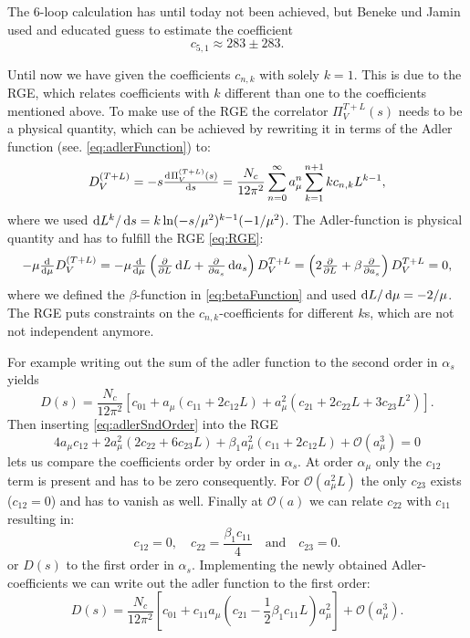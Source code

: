 \documentclass[../../index.tex]{subfiles}
\begin{document}
The 6-loop calculation has until today not been achieved, but Beneke und Jamin
\cite{Beneke2008} used and educated guess to estimate the coefficient
\begin{equation}
  c_{5,1} \approx 283 \pm 283.
\end{equation}

Until now we have given the coefficients $c_{n,k}$ with solely $k=1$. This
is due to the RGE, which relates coefficients with $k$ different than one to the
coefficients mentioned above. To make use of the RGE the correlator $\Pi_V^{T+L}(s)$ needs to
be a physical quantity, which can be achieved by rewriting it in terms of the
Adler function (see. \cref{eq:adlerFunction}) to:
\begin{equation}
  D_V^{(T+L)} = - s \od{\Pi_V^{(T+L)}(s)}{s} = \frac{N_c}{12 \pi^2} \sum_{n=0}^\infty a_\mu^n \sum_{k=1}^{n+1} k c_{n,k} L^{k-1},
\end{equation}
where we used $\dif L^k/ \dif s=k\ln(-s/\mu^2)^{k-1}(-1/\mu^2)$. The
Adler-function is physical quantity and has to fulfill the RGE \cref{eq:RGE}:
\begin{equation}
  -\mu \od{}{\mu} D_V^{(T+L)} = -\mu \od{}{\mu} \left( \pd{}{L} \dif L + \pd{}{a_s} \dif a_s \right) D_V^{T+L}
  = \left( 2\pd{}{L} + \beta \pd{}{a_s} \right) D_V^{T+L} = 0,
\end{equation}
where we defined the $\beta$-function in \cref{eq:betaFunction} and used $\dif L
/ \dif \mu = - 2/ \mu$. The RGE puts constraints on the $c_{n, k}$-coefficients
for different $k$s, which are not not independent anymore.

For example writing out the sum of the adler function to the second order in
$\alpha_s$ yields
\begin{equation}
  \label{eq:adlerSndOrder}
  D(s) = \frac{N_c}{12 \pi^2} \left[ c_{01} + a_\mu(c_{11} + 2 c_{12} L) + a_\mu^2(c_{21} + 2 c_{22} L + 3 c_{23} L^2) \right].
\end{equation}
Then inserting \cref{eq:adlerSndOrder} into the RGE
\begin{equation}
  4 a_\mu c_{12} + 2 a_\mu^2(2 c_{22} + 6 c_{23} L) + \beta_1 a_\mu^2(c_{11} + 2 c_{12}L) + \mathcal{O}(a_\mu^3) = 0
\end{equation}
lets us compare the coefficients order by order in $\alpha_s$. At order
$\alpha_\mu$ only the $c_{12}$ term is present and has to be zero consequently.
For $\mathcal{O}(a_\mu^2 L)$ the only $c_{23}$ exists ($c_{12}=0$) and has to
vanish as well. Finally at $\mathcal{O}(a)$ we can relate $c_{22}$ with $c_{11}$
resulting in:
\begin{equation}
  c_{12} = 0, \quad c_{22} = \frac{\beta_1 c_{11}}{4} \quad \text{and} \quad c_{23} = 0.
\end{equation}
or $D(s)$ to the first order in $\alpha_s$. Implementing the newly obtained
Adler-coefficients we can write out the adler function to the first order:
\begin{equation}
  D(s) = \frac{N_c}{12 \pi^2} \left[ c_{01} + c_{11} a_\mu \left( c_{21} - \frac{1}{2} \beta_1 c_{11} L  \right) a_\mu^2 \right] + \mathcal{O}(a_\mu^3).
\end{equation}
\end{document}
